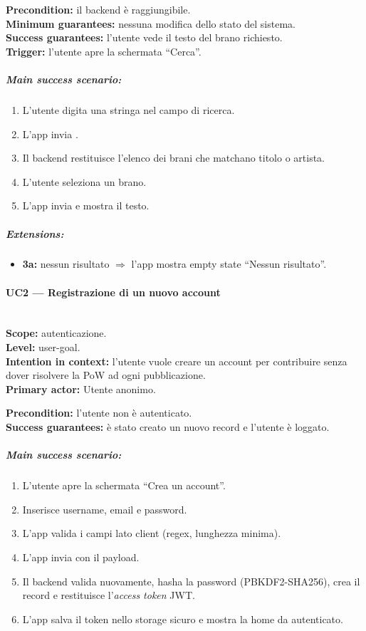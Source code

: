 \textbf{Precondition:} il backend è raggiungibile.\\
\textbf{Minimum guarantees:} nessuna modifica dello stato del sistema.\\
\textbf{Success guarantees:} l'utente vede il testo del brano richiesto.\\
\textbf{Trigger:} l'utente apre la schermata ``Cerca''.

\subparagraph{Main success scenario:}
\begin{enumerate}
    \item L'utente digita una stringa nel campo di ricerca.
    \item L'app invia .
    \item Il backend restituisce l'elenco dei brani che matchano titolo o
    artista.
    \item L'utente seleziona un brano.
    \item L'app invia  e mostra il testo.
\end{enumerate}

\subparagraph{Extensions:}
\begin{itemize}
    \item \textbf{3a:} nessun risultato $\Rightarrow$ l'app mostra empty state
    ``Nessun risultato''.
\end{itemize}

\paragraph{UC2 --- Registrazione di un nuovo account}\hfill\\
\textbf{Scope:} autenticazione.\\
\textbf{Level:} user-goal.\\
\textbf{Intention in context:} l'utente vuole creare un account per
contribuire senza dover risolvere la PoW ad ogni pubblicazione.\\
\textbf{Primary actor:} Utente anonimo.

\textbf{Precondition:} l'utente non è autenticato.\\
\textbf{Success guarantees:} è stato creato un nuovo record  e
l'utente è loggato.

\subparagraph{Main success scenario:}
\begin{enumerate}
    \item L'utente apre la schermata ``Crea un account''.
    \item Inserisce username, email e password.
    \item L'app valida i campi lato client (regex, lunghezza minima).
    \item L'app invia  con il payload.
    \item Il backend valida nuovamente, hasha la password (PBKDF2-SHA256),
    crea il record e restituisce l'\emph{access token} JWT.
    \item L'app salva il token nello storage sicuro e mostra la home da
    autenticato.
\end{enumerate}

